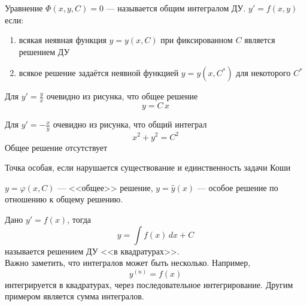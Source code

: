 \begin{Note}
    Уравнение $\Phi(x, y, C) = 0$ --- называется общим интегралом ДУ. $y' = f(x, y)$ если:
    \begin{enumerate}
        \item всякая неявная функция $y = y(x, C)$ при фиксированном $C$ является решением ДУ
        \item всякое решение задаётся неявной функцией $y = y(x, C^*)$ для некоторого $C^*$
    \end{enumerate}
\end{Note}

\begin{Example}
    Для $y' = \frac{y}{x}$ очевидно из рисунка, что общее решение
    \[
        y = C \, x
    \]
\end{Example}

\begin{Example}
    Для $y' = -\frac{x}{y}$ очевидно из рисунка, что общий интеграл 
    \[
        x^2 + y^2 = C^2
    \]
    Общее решение отсутствует
\end{Example}

\begin{Note}
    Точка особая, если нарушается существование и единственность задачи Коши
\end{Note}

\begin{Note}
    $y = \varphi(x, C)$ --- <<общее>> решение, $y = \hat{y}(x)$ --- особое решение по отношению к общему решению.
\end{Note}

\begin{Note}
    Дано $y' = f(x)$, тогда 
    \[
        y = \int{f(x)\,dx} + C
    \] 
    называется решением ДУ <<в квадратурах>>.\\
    Важно заметить, что интегралов может быть несколько. Например,
    \[
        y^{(n)} = f(x)
    \] 
    интегрируется в квадратурах, через последовательное интегрирование. Другим примером является сумма интегралов.
\end{Note}
